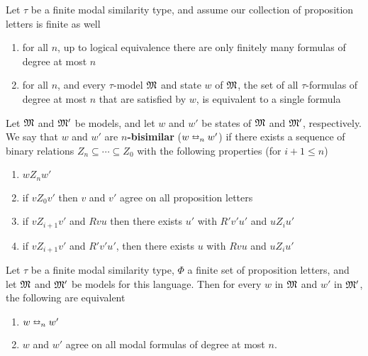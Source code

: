 \documentclass[11pt]{article}
\begin{document}
\begin{proposition}[]
\label{prop2.29}
Let \(\tau\) be a finite modal similarity type, and assume our collection of
proposition letters is finite as well
\begin{enumerate}
\item for all \(n\), up to logical equivalence there are only finitely many
formulas of degree at most \(n\)
\item for all \(n\), and every \(\tau\)-model \(\mathfrak{M}\) and state \(w\) of
\(\mathfrak{M}\), the set of all \(\tau\)-formulas of degree at most \(n\) that
are satisfied by \(w\), is equivalent to a single formula
\end{enumerate}
\end{proposition}

\begin{definition}[$n$-Bisimulation]
Let \(\mathfrak{M}\) and \(\mathfrak{M}'\) be models, and let \(w\) and \(w'\) be states of
\(\mathfrak{M}\) and \(\mathfrak{M}'\), respectively. We say that \(w\) and \(w'\) are
\textbf{\(n\)-bisimilar} (\(w\leftrightarroweq_nw'\)) if there exists a sequence of
binary relations \(Z_n\subseteq\cdots\subseteq Z_0\) with the following
properties (for \(i+1\le n\))
\begin{enumerate}
\item \(wZ_nw'\)
\item if \(vZ_0v'\) then \(v\) and \(v'\) agree on all proposition letters
\item if \(vZ_{i+1}v'\) and \(Rvu\) then there exists \(u'\) with \(R'v'u'\)
and \(uZ_iu'\)
\item if \(vZ_{i+1}v'\) and \(R'v'u'\), then there exists \(u\) with \(Rvu\)
and \(uZ_iu'\)
\end{enumerate}
\end{definition}

\begin{proposition}[]
\label{prop2.31}
Let \(\tau\) be a finite modal similarity type, \(\Phi\) a finite set of proposition
letters, and let \(\mathfrak{M}\) and \(\mathfrak{M}'\) be models for this language. Then for
every \(w\) in \(\mathfrak{M}\) and \(w'\) in \(\mathfrak{M}'\), the following are equivalent
\begin{enumerate}
\item \(w\leftrightarroweq_nw'\)
\item \(w\) and \(w'\) agree on all modal formulas of degree at most \(n\).
\end{enumerate}
\end{proposition}
\end{document}
